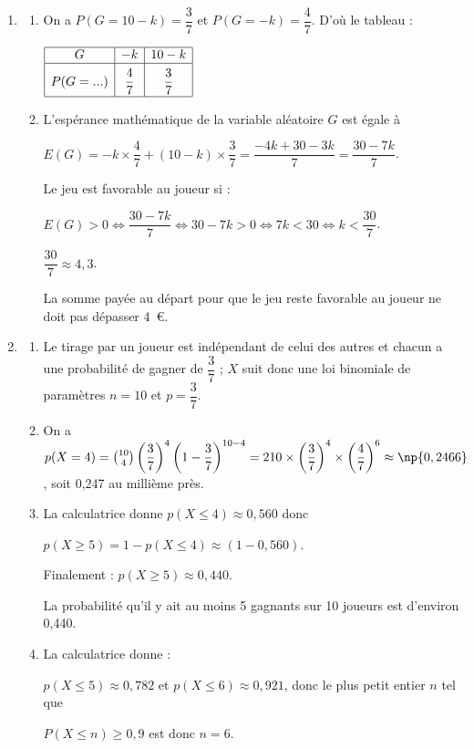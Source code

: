 \begin{enumerate}[resume]
\item 





	\begin{enumerate}
		\item 
On a $P(G = 10 - k) = \dfrac{3}{7}$ et $P(G = -k) = \dfrac{4}{7}$. D'où le tableau :

\begin{center}
$\begin{array}{|*{3}{c|}}\hline
G				&- k			&10 - k\\ \hline
P(G = ...)		&\dfrac{4}{7}	&\dfrac{3}{7}\rule[-3mm]{0mm}{9mm}\\ \hline
\end{array}$
\end{center}
		\item 
L'espérance mathématique de la variable aléatoire $G$ est égale à 
		
$E(G) = - k \times \dfrac{4}{7} + (10 - k) \times \dfrac{3}{7} = \dfrac{-4k + 30 - 3k}{7} = \dfrac{30 - 7k}{7}$.

Le jeu est favorable au joueur si :

$E(G) > 0 \iff \dfrac{30 - 7k}{7} \iff 30 - 7k > 0 \iff 7k < 30 \iff k < \dfrac{30}{7}$.

$\dfrac{30}{7} \approx 4,3$.

La somme payée au départ pour que le jeu reste favorable au joueur ne doit pas dépasser 4~\euro.	
	\end{enumerate}
\item 


	\begin{enumerate}
		\item 
Le tirage par un joueur est indépendant de celui des autres et chacun a une probabilité de gagner de $\dfrac{3}{7}$ ; $X$ suit donc une loi binomiale de paramètres $n = 10$ et $p = \dfrac{3}{7}$.
		\item 
On a $p(X = 4) = \binom{10}{4}\left(\dfrac{3}{7}\right)^4\left( 1 - \dfrac{3}{7}  \right)^{10-4} = 210 \times\left(\dfrac{3}{7}\right)^4 \times \left(\dfrac{4}{7}\right)^6 \approx \np{0,2466}$, soit 0,247 au millième près.
		\item  
La calculatrice donne $p(X\leqslant 4) \approx 0,560$ donc 

$p(X\geqslant 5) = 1 - p(X\leqslant 4) \approx (1 - 0,560)$.

Finalement : $p(X\geqslant 5) \approx 0,440$.
		
La probabilité qu'il y ait au moins 5 gagnants sur 10 joueurs est d'environ 0,440.
		\item 
La calculatrice donne :
		
$p(X \leqslant 5) \approx 0,782$ et $p(X \leqslant 6) \approx 0,921$, donc 
le plus petit entier $n$ tel que 

$P(X \leqslant n) \geqslant 0,9$ est donc $n = 6$.
	\end{enumerate}
\end{enumerate}


\medskip
